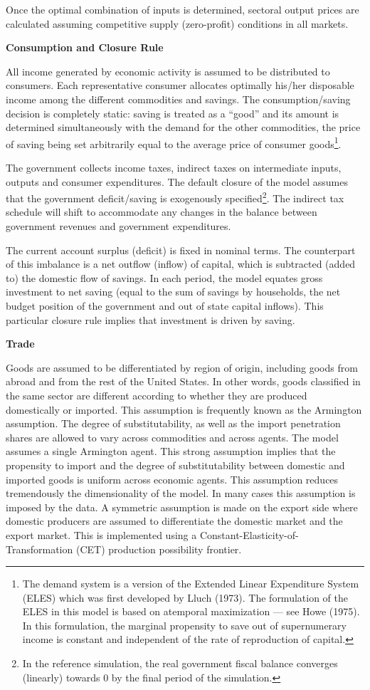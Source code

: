 \documentclass{article}
\begin{document}
Once the optimal combination of inputs is determined, sectoral output prices are calculated assuming competitive supply (zero-profit) conditions in all markets.

\textbf{Consumption and Closure Rule}

All income generated by economic activity is assumed to be distributed to consumers. Each representative consumer allocates optimally his/her disposable income among the different commodities and savings. The consumption/saving decision is completely static: saving is treated as a “good” and its amount is determined simultaneously with the demand for the other commodities, the price of saving being set arbitrarily equal to the average price of consumer goods\footnote{ The demand system is a version of the Extended Linear Expenditure System (ELES) which was first developed by Lluch (1973). The formulation of the ELES in this model is based on atemporal maximization — see Howe (1975). In this formulation, the marginal propensity to save out of supernumerary income is constant and independent of the rate of reproduction of capital.}.

The government collects income taxes, indirect taxes on intermediate inputs, outputs and consumer expenditures. The default closure of the model assumes that the government deficit/saving is exogenously specified\footnote{In the reference simulation, the real government fiscal balance converges (linearly) towards 0 by the final period of the simulation.}. The indirect tax schedule will shift to accommodate any changes in the balance between government revenues and government expenditures.

The current account surplus (deficit) is fixed in nominal terms. The counterpart of this imbalance is a net outflow (inflow) of capital, which is subtracted (added to) the domestic flow of savings. In each period, the model equates gross investment to net saving (equal to the sum of savings by households, the net budget position of the government and out of state capital inflows). This particular closure rule implies that investment is driven by saving.

\textbf{Trade}

Goods are assumed to be differentiated by region of origin, including goods from abroad and from the rest of the United States. In other words, goods classified in the same sector are different according to whether they are produced domestically or imported. This assumption is frequently known as the Armington assumption. The degree of substitutability, as well as the import penetration shares are allowed to vary across commodities and across agents. The model assumes a single Armington agent. This strong assumption implies that the propensity to import and the degree of substitutability between domestic and imported goods is uniform across economic agents. This assumption reduces tremendously the dimensionality of the model. In many cases this assumption is imposed by the data. A symmetric assumption is made on the export side where domestic producers are assumed to differentiate the domestic market and the export market. This is implemented using a Constant-Elasticity-of-Transformation (CET) production possibility frontier.
\end{document}
